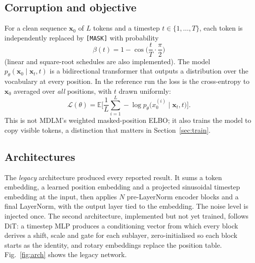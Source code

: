 \documentclass[conference]{IEEEtran}
\newcommand{\mask}{\texttt{[MASK]}}
\newcommand{\xzero}{\mathbf{x}_0}
\newcommand{\xt}{\mathbf{x}_t}
\begin{document}
\subsection{Corruption and objective}

For a clean sequence $\xzero$ of $L$ tokens and a timestep $t\in\{1,\dots,T\}$,
each token is independently replaced by \mask{} with probability
\begin{equation}
  \beta(t)=1-\cos\!\Big(\frac{t}{T}\cdot\frac{\pi}{2}\Big)
\end{equation}
(linear and square-root schedules are also implemented). The model
$p_\theta(\xzero\mid\xt,t)$ is a bidirectional transformer that outputs a
distribution over the vocabulary at every position. In the reference run the
loss is the cross-entropy to $\xzero$ averaged over \emph{all} positions, with
$t$ drawn uniformly:
\begin{equation}
  \mathcal{L}(\theta)=\mathbb{E}\Big[\frac1L\sum_{i=1}^{L}
  -\log p_\theta\big(x_0^{(i)}\mid\xt,t\big)\Big].
\end{equation}
This is not MDLM's weighted masked-position ELBO; it also trains the model to
copy visible tokens, a distinction that matters in Section~\ref{sec:train}.

\subsection{Architectures}

The \emph{legacy} architecture produced every reported result. It sums a token
embedding, a learned position embedding and a projected sinusoidal timestep
embedding at the input, then applies $N$ pre-LayerNorm encoder blocks and a
final LayerNorm, with the output layer tied to the embedding. The noise level is
injected once. The second architecture, implemented but not yet trained,
follows DiT: a timestep MLP produces a conditioning vector from which every
block derives a shift, scale and gate for each sublayer, zero-initialised so
each block starts as the identity, and rotary embeddings replace the position
table.
Fig.~\ref{fig:arch} shows the legacy network.
\end{document}
